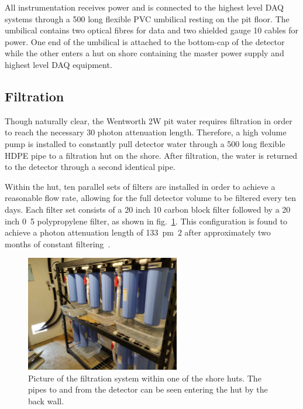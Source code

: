 All \chipsfive instrumentation receives power and is connected to the highest level DAQ systems
through a \unit{500}{} long flexible PVC umbilical resting on the pit floor. The
umbilical contains two optical fibres for data and two shielded gauge 10 cables for power. One end
of the umbilical is attached to the bottom-cap of the detector while the other enters a hut on
shore containing the master power supply and highest level DAQ equipment.

\subsection{Filtration} %
\label{sec:chips_detector_water} %

Though naturally clear, the Wentworth 2W pit water requires filtration in order to reach the
necessary \unit{30}{} photon attenuation length. Therefore, a high volume pump is
installed to constantly pull detector water through a \unit{500}{} long flexible HDPE
pipe to a filtration hut on the shore. After filtration, the water is returned to the detector
through a second identical pipe.

Within the hut, ten parallel sets of filters are installed in order to achieve a reasonable flow
rate, allowing for the full detector volume to be filtered every ten days. Each filter set
consists of a 20 inch \unit{10}{\mu{}} carbon block filter followed by a 20 inch
\unit{0.5}{\mu{}} polypropylene filter, as shown in fig.~\ref{fig:filtration}. This
configuration is found to achieve a photon attenuation length of \unit{133\pm2}{} after
approximately two months of constant filtering~\cite{campbell2020}.

\begin{figure} %
    \includegraphics[width=0.6\textwidth]{diagrams/4-chips/filtration.pdf}
    \caption[Picture of the \chipsfive filtration system]
    {Picture of the \chipsfive filtration system within one of the shore huts. The pipes to and
        from the detector can be seen entering the hut by the back wall.}
    \label{fig:filtration}
\end{figure}

